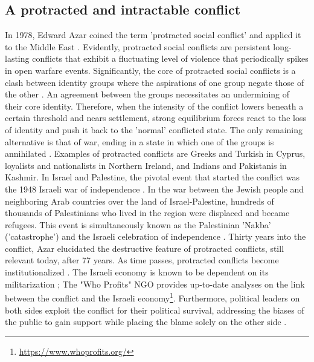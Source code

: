 \documentclass[dissertation,math,vertlayout,pdfa,colorlinks]{aaltoseries}
\begin{document}
\subsection{A protracted and intractable conflict}
In 1978, Edward Azar coined the term 'protracted social conflict' and applied it to the Middle East \cite{azarProtractedSocialConflict1978}. Evidently, protracted social conflicts are persistent long-lasting conflicts that exhibit a fluctuating level of violence that periodically spikes in open warfare events. Significantly, the core of protracted social conflicts is a clash between identity groups where the aspirations of one group negate those of the other \cite[p. 77]{fisherInteractiveConflictResolution1997}. An agreement between the groups necessitates an undermining of their core identity. Therefore, when the intensity of the conflict lowers beneath a certain threshold and nears settlement, strong equilibrium forces react to the loss of identity and push it back to the 'normal' conflicted state. The only remaining alternative is that of war, ending in a state in which one of the groups is annihilated \cite{azarProtractedSocialConflict1978}. Examples of protracted conflicts are Greeks and Turkish in Cyprus, loyalists and nationalists in Northern Ireland, and Indians and Pakistanis in Kashmir. In Israel and Palestine, the pivotal event that started the conflict was the 1948 Israeli war of independence \cite{selaIsraeliPalestinianMemories2016}. In the war between the Jewish people and neighboring Arab countries over the land of Israel-Palestine, hundreds of thousands of Palestinians who lived in the region were displaced and became refugees. This event is simultaneously known as the Palestinian 'Nakba' ('catastrophe') and the Israeli celebration of independence \cite{pogrund1948IndependenceNakba2008}. Thirty years into the conflict, Azar elucidated the destructive feature of protracted conflicts, still relevant today, after 77 years. As time passes, protracted conflicts become institutionalized \cite{azarProtractedSocialConflict1978}. The Israeli economy is known to be dependent on its militarization \cite{sandovalMilitaryIndustryIsraelPalestine2021}; The "Who Profits" NGO provides up-to-date analyses on the link between the conflict and the Israeli economy\footnote{\url{https://www.whoprofits.org/}}. Furthermore, political leaders on both sides exploit the conflict for their political survival, addressing the biases of the public to gain support while placing the blame solely on the other side \cite{behrmanExploitingCognitionBlame2021}.
\end{document}

